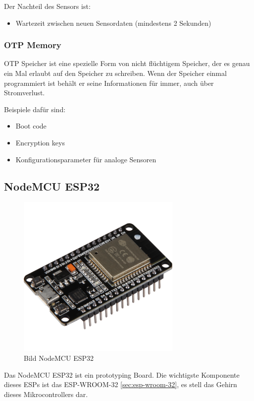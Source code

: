Der Nachteil des Sensors ist:
\begin{itemize}
    \item Wartezeit zwischen neuen Sensordaten (mindestens 2 Sekunden)
\end{itemize}

\subsubsection{OTP Memory}\label{sec:otp}
OTP Speicher ist eine spezielle Form von nicht flüchtigem Speicher, der es genau ein Mal erlaubt auf den Speicher zu schreiben. Wenn der Speicher einmal programmiert ist behält er seine Informationen für immer, auch über Stromverlust.

Beispiele dafür sind:
\begin{itemize}
    \item Boot code
    \item Encryption keys
    \item Konfigurationsparameter für analoge Sensoren
\end{itemize}

\subsection{NodeMCU ESP32}
\label{sec:nodemcu_esp32}

\begin{figure}[H]
    \begin{center}
        \includegraphics[scale=0.8]{images/NodeMCU-ESP32.png}
        \caption{Bild NodeMCU ESP32 \cite{nodemcu_picture_joy-it}}
    \end{center}
\end{figure}

Das NodeMCU ESP32 ist ein prototyping Board. Die wichtigste Komponente dieses ESPs ist das ESP-WROOM-32 \ref{sec:esp-wroom-32}, es stell das Gehirn dieses Mikrocontrollers dar.

